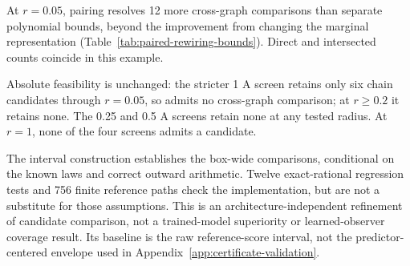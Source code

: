 At $r=0.05$, pairing resolves 12 more cross-graph comparisons than separate
polynomial bounds, beyond the improvement from changing the marginal
representation (Table~\ref{tab:paired-rewiring-bounds}). Direct and intersected
counts coincide in this example.

Absolute feasibility is unchanged: the
stricter 1 A screen retains only six chain candidates through $r=0.05$, so
admits no cross-graph comparison; at $r\ge0.2$ it retains none. The 0.25 and
0.5 A screens retain none at any tested radius. At $r=1$, none of the four
screens admits a candidate.

The interval construction establishes the box-wide comparisons, conditional
on the known laws and correct outward arithmetic. Twelve exact-rational
regression tests and 756 finite reference paths check the implementation,
but are not a substitute for those assumptions. This is an
architecture-independent refinement of candidate comparison, not a
trained-model superiority or learned-observer coverage result. Its baseline
is the raw reference-score interval, not the predictor-centered envelope
used in Appendix~\ref{app:certificate-validation}.
\FloatBarrier

